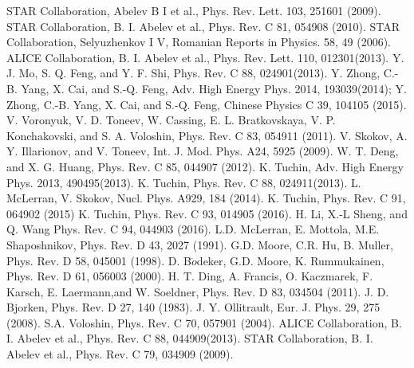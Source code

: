 \documentclass[twocolumn,showpacs,preprintnumbers,amsmath,amssymb]{revtex4}
\begin{document}
\begin{thebibliography}{}
 STAR Collaboration, Abelev B I et al., Phys. Rev. Lett. 103, 251601 (2009).
 STAR Collaboration, B. I. Abelev et al., Phys. Rev. C 81, 054908 (2010).
 STAR Collaboration, Selyuzhenkov I V, Romanian Reports in Physics. 58, 49 (2006).
 ALICE Collaboration, B. I. Abelev et al., Phys. Rev. Lett. 110, 012301(2013).
 Y. J. Mo, S. Q. Feng, and Y. F. Shi,  Phys. Rev. C 88,  024901(2013).
 Y. Zhong, C.-B. Yang, X. Cai, and S.-Q. Feng, Adv. High Energy Phys. 2014, 193039(2014); Y. Zhong, C.-B. Yang, X. Cai, and S.-Q. Feng, Chinese Physics C 39, 104105 (2015).
 V. Voronyuk, V. D. Toneev, W. Cassing, E. L. Bratkovskaya, V. P. Konchakovski, and S. A. Voloshin, Phys. Rev. C 83, 054911 (2011).
 V. Skokov, A. Y. Illarionov, and V. Toneev, Int. J. Mod. Phys. A24, 5925 (2009).
 W. T. Deng, and X. G. Huang, Phys. Rev. C 85, 044907 (2012).
 K. Tuchin,  Adv. High Energy Phys. 2013, 490495(2013).
 K. Tuchin, Phys. Rev. C 88, 024911(2013).
 L. McLerran, V. Skokov, Nucl. Phys. A929, 184 (2014).
 K. Tuchin, Phys. Rev. C 91, 064902 (2015)
 K. Tuchin, Phys. Rev. C 93, 014905 (2016).
 H. Li, X.-L Sheng, and Q. Wang Phys. Rev. C 94, 044903 (2016).
 L.D. McLerran, E. Mottola, M.E. Shaposhnikov, Phys. Rev. D 43, 2027 (1991).
 G.D. Moore, C.R. Hu, B. Muller, Phys. Rev. D 58,  045001 (1998).
 D. B$\ddot{o}$deker, G.D. Moore, K. Rummukainen, Phys. Rev. D 61, 056003 (2000).
 H. T. Ding, A. Francis, O. Kaczmarek, F. Karsch, E. Laermann,and W. Soeldner, Phys. Rev. D 83, 034504 (2011).
 J. D. Bjorken, Phys. Rev. D 27, 140 (1983).
 J. Y. Ollitrault, Eur. J. Phys. 29, 275 (2008).
 S.A. Voloshin, Phys. Rev. C 70, 057901 (2004).
 ALICE Collaboration, B. I. Abelev et al., Phys. Rev. C 88, 044909(2013).
 STAR Collaboration, B. I. Abelev et al., Phys. Rev. C 79, 034909 (2009).
\end{thebibliography}{}
\end{document}
